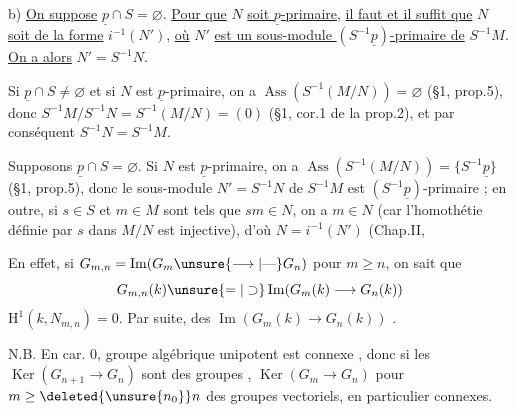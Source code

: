 b) \uline{On suppose} $\underline p\cap S=\varnothing$. \uline{Pour que} $N$ \uline{soit $\underline p$-primaire}, \uline{il faut et il suffit que} $N$ \uline{soit de la forme} $i^{-1}(N')$, \uline{où} $N'$ \uline{est un sous-module $(S^{-1}\underline p)$-primaire de} $S^{-1}M$. \uline{On a alors} $N'=S^{-1}N$.

Si $\underline p\cap S\neq\varnothing$ et si $N$ est $\underline p$-primaire, on a $\operatorname{Ass}(S^{-1}(M/N))=\varnothing$ (§1, prop.5), donc $S^{-1}M/S^{-1}N=S^{-1}(M/N)=(0)$ (§1, cor.1 de la prop.2), et par conséquent $S^{-1}N=S^{-1}M$.

Supposons $\underline p\cap S=\varnothing$. Si $N$ est $\underline p$-primaire, on a $\operatorname{Ass}(S^{-1}(M/N))=\{S^{-1}\underline p\}$ (§1, prop.5), donc le sous-module $N'=S^{-1}N$ de $S^{-1}M$ est $(S^{-1}\underline p)$-primaire ; en outre, si $s\in S$ et $m\in M$ sont tels que $sm\in N$, on a $m\in N$ (car l'homothétie définie par $s$ dans $M/N$ est injective), d'où $N=i^{-1}(N')$ (Chap.II,





En effet, si $G_{m,n}=\operatorname{Im}(G_m\unsure{\longrightarrow|\text{---}}G_n)$ pour $m\geq n$, on sait que
\[
G_{m,n}(k)\unsure{=|\supset}\operatorname{Im}(G_m(k)\longrightarrow G_n(k))
\]
 $\mathrm H^1(k,N_{m,n})=0$. Par suite,   des $\operatorname{Im}(G_m(k)\longrightarrow G_n(k))$  .

N.B. En car. 0,  groupe algébrique  unipotent est connexe , donc si les $\operatorname{Ker}(G_{n+1}\longrightarrow G_n)$ sont des groupes ,   $\operatorname{Ker}(G_m\longrightarrow G_n)$ pour $m\geq\deleted{\unsure{n_0}}n$  des groupes vectoriels, en particulier connexes.

